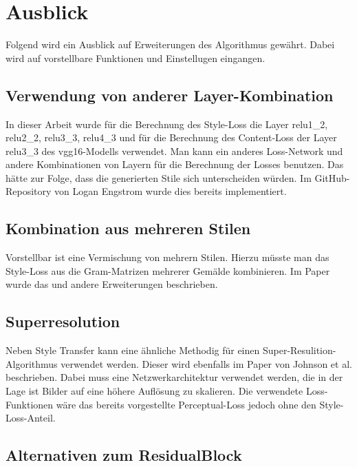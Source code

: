 \section{Ausblick}

Folgend wird ein Ausblick auf Erweiterungen des Algorithmus gewährt. Dabei wird auf vorstellbare Funktionen und Einstellugen eingangen.

\subsection{Verwendung von anderer Layer-Kombination}

In dieser Arbeit wurde für die Berechnung des Style-Loss die Layer relu1\_2, relu2\_2, relu3\_3, relu4\_3 und für die Berechnung des Content-Loss der Layer relu3\_3 des \gls{vgg16}-Modells verwendet. Man kann ein anderes Loss-Network und andere Kombinationen von Layern für die Berechnung der Losses benutzen. Das hätte zur Folge, dass die generierten Stile sich unterscheiden würden. Im GitHub-Repository von Logan Engstrom  \cite{engstrom2016faststyletransfer} wurde dies bereits implementiert.

\subsection{Kombination aus mehreren Stilen}
\label{sec:combination_many_styles}

Vorstellbar ist eine Vermischung von mehrern Stilen. Hierzu müsste man das Style-Loss aus die Gram-Matrizen mehrerer Gemälde kombinieren. Im Paper \cite{stanfordStyleTransfer} wurde das und andere Erweiterungen beschrieben.

\subsection{Superresolution}
\label{sec:superresolution}

Neben Style Transfer kann eine ähnliche Methodig für einen Super-Resulition-Algorithmus verwendet werden. Dieser wird ebenfalls im Paper von Johnson et al. \cite{DBLP:journals/corr/JohnsonAL16} beschrieben. Dabei muss eine Netzwerkarchitektur verwendet werden, die in der Lage ist Bilder auf eine höhere Auflösung zu skalieren. Die verwendete Loss-Funktionen wäre das bereits vorgestellte Perceptual-Loss jedoch ohne den Style-Loss-Anteil.

\subsection{Alternativen zum ResidualBlock}
\label{sec:alternatives_to_residual_block}


